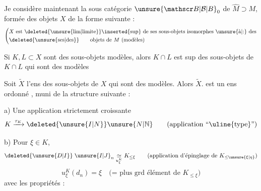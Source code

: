 Je considère maintenant la sous catégorie $ {\unsure{\mathscr B|\mathcal B|B}}_0$ de $\widehat M\supset M$, formée des objets $X$ de la forme suivante :
\[
\left(\begin{aligned}
&X\text{ est }\deleted{\text{\unsure{lim|limite}}}\inserted{\text{sup}}\text{ de ses sous-objets isomorphes \unsure{à|:} des}\\
&\deleted{\text{\unsure{ses|des}}}\qquad\text{objets de }M\text{ (modèles)}
\end{aligned}\right.
\]

Si $K,L\subset X$ sont des sous-objets modèles, alors $K\cap L$ est sup des sous-objets de $K\cap L$ qui sont des modèles

Soit  $\widetilde X$ l'ens des  sous-objets de $X$ qui sont des modèles. Alors $\widetilde X$. est un ens ordonné , muni de la structure suivante  : 

a)  Une application strictement croissante
\[
K\xrightarrow{\tau_K}\deleted{\unsure{I|N}}\unsure{N|\mathbb N}
\qquad\text{(application ``\uline{type}'')}
\]

b) Pour  $\xi\in K$,    
\[
\deleted{\unsure{D|I}}\;{\unsure{I|J}}_n\underset{u_\xi^K}{\simeq}K_{\leq\xi}
\qquad\text{(application d'épinglage de }K_{\leq\unsure{\xi|\eta}}\text{)}
\]
\[
u_\xi^K(d_n)=\xi\quad\text{(= plus grd élément de }K_{\leq\xi}\text{)}
\]
avec  les propriétés  :

